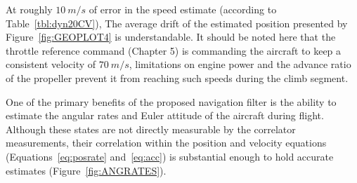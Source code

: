At roughly \(10~m/s\) of error in the speed estimate (according to Table~\ref{tbl:dyn20CV}), The average drift of the estimated position presented by Figure~\ref{fig:GEOPLOT4} is understandable. It should be noted here that the throttle reference command (Chapter 5) is commanding the aircraft to keep a consistent velocity of \(70~m/s\), limitations on engine power and the advance ratio of the propeller prevent it from reaching such speeds during the climb segment.

One of the primary benefits of the proposed navigation filter is the ability to estimate the angular rates and Euler attitude of the aircraft during flight. Although these states are not directly measurable by the correlator measurements, their correlation within the position and velocity equations (Equations~\ref{eq:posrate} and~\ref{eq:acc}) is substantial enough to hold accurate estimates (Figure~\ref{fig:ANGRATES}).

